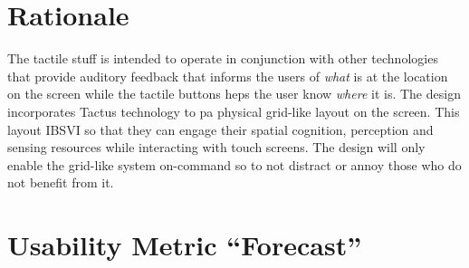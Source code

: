 \documentclass[11pt]{article}
\begin{document}
\section{Rationale}
The tactile stuff is intended to operate in conjunction with other technologies that provide auditory feedback that informs the users of \textit{what} is at the location on the screen while the tactile buttons heps the user know \textit{where} it is. 
The design incorporates Tactus technology to pa physical grid-like layout on the screen. This layout IBSVI so that they can engage their spatial cognition, perception and sensing resources while interacting with touch screens. The design will only enable the grid-like system on-command so to not distract or annoy those who do not benefit from it.

\section{Usability Metric ``Forecast''}
\clearpage


{}

\end{document}
